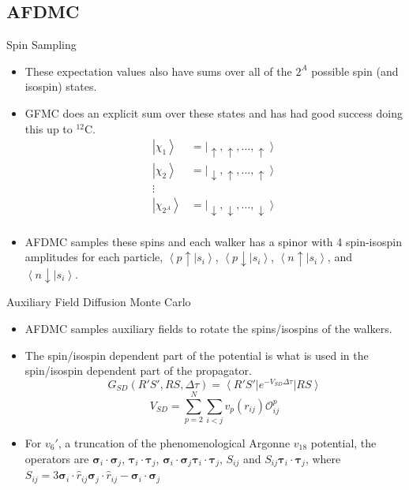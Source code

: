 \documentclass{beamer}
\newcommand{\red}[1]{{\color{red}{#1}}}
\newcommand{\ket}[1]{\left| #1 \right>}
\newcommand{\bra}[1]{\left< #1 \right|}
\newcommand{\braket}[2]{\left< #1 | #2 \right>}
\newcommand{\Opij}{\mathcal{O}_{ij}^p}
\newcommand{\dt}{\Delta\tau}
\newcommand{\ti}{\bm{\tau}_i}
\newcommand{\tj}{\bm{\tau}_j}
\newcommand{\si}{\bm{\sigma}_i}
\newcommand{\sj}{\bm{\sigma}_j}
\begin{document}
\subsection{AFDMC}
\begin{frame}{Spin Sampling}
\begin{itemize}
   \item These expectation values also have sums over all of the $2^A$ possible spin (and isospin) states.
   \item GFMC does an explicit sum over these states and has had good success doing this up to $^{12}$C.
   \begin{equation*}
   \begin{split}
      \ket{\chi_1} &= \ket{\uparrow,\uparrow,\ldots,\uparrow} \\
      \ket{\chi_2} &= \ket{\downarrow,\uparrow,\ldots,\uparrow} \\
      \vdots & \\
      \ket{\chi_{2^A}} &= \ket{\downarrow,\downarrow,\ldots,\downarrow} \\
   \end{split}
   \end{equation*}
   \item AFDMC samples these spins and each walker has a spinor with 4 spin-isospin amplitudes for each particle, $\braket{p\uparrow}{s_i}$, $\braket{p\downarrow}{s_i}$, $\braket{n\uparrow}{s_i}$, and $\braket{n\downarrow}{s_i}$.
\end{itemize}
\end{frame}

\begin{frame}{Auxiliary Field Diffusion Monte Carlo}
\begin{itemize}
   \item AFDMC samples auxiliary fields to rotate the spins/isospins of the walkers.
   \item The spin/isospin dependent part of the potential is what is used in the spin/isospin dependent part of the propagator.
   \begin{equation*}
      G_{SD}(R'S',RS,\dt) = \bra {R'S'}e^{-V_{SD}\dt} \ket{RS}
   \end{equation*}
   \begin{equation*}
      V_{SD} = \sum\limits_{p=2}^N\sum\limits_{i<j}v_p(r_{ij})\Opij
   \end{equation*}
   \item For $v_6'$, a truncation of the phenomenological Argonne $v_{18}$ potential, the operators are $\si\cdot\sj$, $\ti\cdot\tj$, $\si\cdot\sj \ti\cdot\tj$, $S_{ij}$ and $S_{ij} \ti\cdot\tj$, where $S_{ij} = 3\si\cdot\hat{r}_{ij}\sj\cdot\hat{r}_{ij}-\si\cdot\sj$
   \red{\\ What does the rest of the potential look like?}
\end{itemize}
\end{frame}
\end{document}
